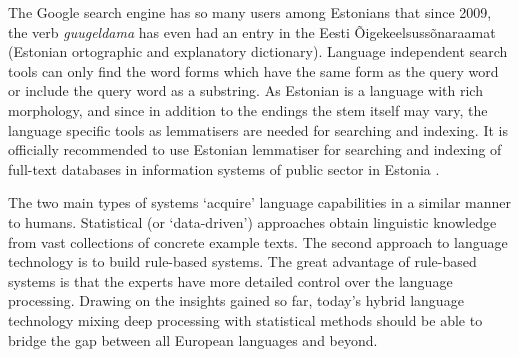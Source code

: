 \begin{multicols}{2}
The Google search engine has so many users among Estonians that since 2009, the verb \textit{guugeldama} has even had an entry in the Eesti Õigekeelsussõnaraamat (Estonian ortographic and explanatory dictionary).
Language independent search tools can only find the word forms which have the same form as the query word or include the query word as a substring. 
As Estonian is a language with rich morphology, and since in addition to the endings the stem itself may vary, the language specific tools as lemmatisers are needed for searching and indexing. 
It is officially recommended to use Estonian lemmatiser for searching and indexing of full-text databases in information systems of public sector in Estonia \cite{RIA}.

The two main types of systems ‘acquire’ language capabilities in a similar manner to humans. Statistical (or ‘data-driven’) approaches obtain linguistic knowledge from vast collections of concrete example texts. 
The second approach to language technology is to build rule-based systems. The great advantage of rule-based systems is that the experts have more detailed control over the language processing.  
Drawing on the insights gained so far, today’s hybrid language technology mixing deep processing with statistical methods should be able to bridge the gap between all European languages and beyond. 



\end{multicols}

